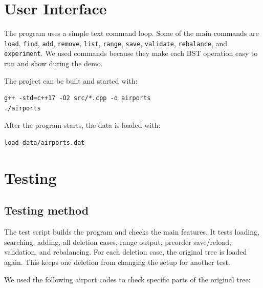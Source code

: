 \documentclass[12pt]{article}
\begin{document}
\section{User Interface}

The program uses a simple text command loop. Some of the main commands are \texttt{load}, \texttt{find}, \texttt{add}, \texttt{remove}, \texttt{list}, \texttt{range}, \texttt{save}, \texttt{validate}, \texttt{rebalance}, and \texttt{experiment}. We used commands because they make each BST operation easy to run and show during the demo.

The project can be built and started with:

\begin{Verbatim}[fontsize=\small,frame=single]
g++ -std=c++17 -O2 src/*.cpp -o airports
./airports
\end{Verbatim}

After the program starts, the data is loaded with:

\begin{Verbatim}[fontsize=\small,frame=single]
load data/airports.dat
\end{Verbatim}

\section{Testing}

\subsection{Testing method}

The test script builds the program and checks the main features. It tests loading, searching, adding, all deletion cases, range output, preorder save/reload, validation, and rebalancing. For each deletion case, the original tree is loaded again. This keeps one deletion from changing the setup for another test.

We used the following airport codes to check specific parts of the original tree:
\end{document}
